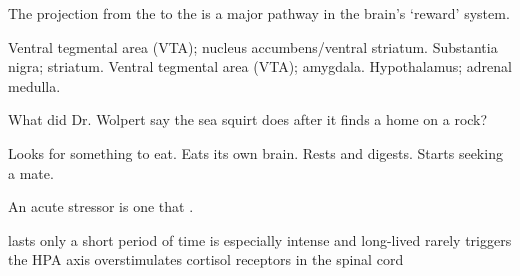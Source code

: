 \documentclass[answers]{exam}
\begin{document}
\begin{questions}
\question The projection from the \fillin to the \fillin is a major pathway in the brain's `reward' system.
\begin{choices}
\correctchoice Ventral tegmental area (VTA); nucleus accumbens/ventral striatum.
\choice Substantia nigra; striatum.
\choice Ventral tegmental area (VTA); amygdala.
\choice Hypothalamus; adrenal medulla.
\end{choices}

\question What did Dr. Wolpert say the sea squirt does after it finds a home on a rock?
\begin{choices}
\choice Looks for something to eat.
\correctchoice Eats its own brain.
\choice Rests and digests.
\choice Starts seeking a mate.
\end{choices}

\question An acute stressor is one that \fillin.
\begin{choices}
\correctchoice lasts only a short period of time
\choice is especially intense and long-lived
\choice rarely triggers the HPA axis
\choice overstimulates cortisol receptors in the spinal cord
\end{choices}

\end{questions}
\end{document}
